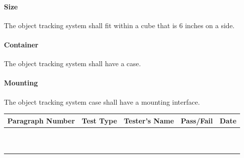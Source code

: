 \paragraph{Size}
The object tracking system shall fit within a cube that is 6 inches on a side.

\paragraph{Container}
The object tracking system shall have a case. 

\paragraph{Mounting}
The object tracking system case shall have a mounting interface. 



%

\begin{table}[h]
\centering
\begin{tabular}{|c|c|C{6cm}|c|c|}
\hline
\textbf{Paragraph Number} & \textbf{Test Type}& 
\textbf{Tester's Name} & \textbf{Pass/Fail} & \textbf{Date} \\
\hline
 & & & & \\
\hline
 & & & & \\
\hline
 & & & & \\
\hline
 & & & & \\
\hline
 & & & & \\
\hline
 & & & & \\
\hline
 & & & & \\
\hline
 & & & & \\
\hline
 & & & & \\
\hline
 & & & & \\
\hline
\end{tabular}
\end{table}
%
%
